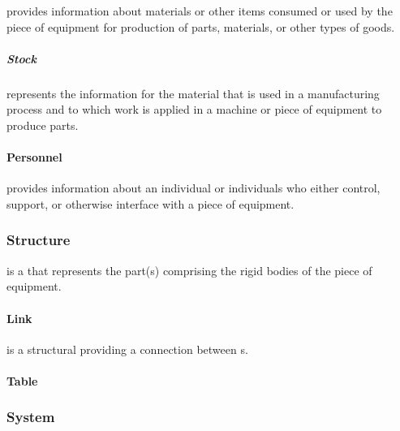  provides information about materials or other items consumed or used by the piece of equipment for production of parts, materials, or other types of goods.



\subparagraph{Stock}\mbox{}
\label{sec:Stock}


 represents the information for the material that is used in a manufacturing process and to which work is applied in a machine or piece of equipment to produce parts.



\paragraph{Personnel}\mbox{}
\label{sec:Personnel}


 provides information about an individual or individuals who either control, support, or otherwise interface with a piece of equipment.




\subsubsection{Structure}
\label{sec:Structure}



 is a  that represents the part(s) comprising the rigid bodies of the piece of equipment.



\paragraph{Link}\mbox{}
\label{sec:Link}


 is a structural  providing a connection between s.



\paragraph{Table}\mbox{}
\label{sec:Table}






\subsubsection{System}
\label{sec:System}



